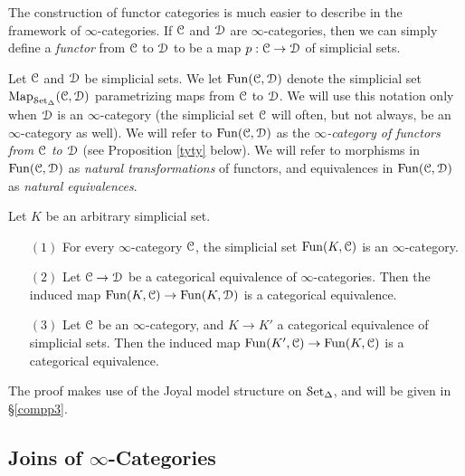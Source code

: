 \begin{Didn't Read}
The construction of functor categories is much easier to describe in the framework of $\infty$-categories. If $\calC$ and $\calD$ are
$\infty$-categories, then we can simply define a {\it functor} from
$\calC$ to $\calD$ to be a map $p: \calC \rightarrow \calD$ of simplicial sets.

\begin{notation}
Let $\calC$ and $\calD$ be simplicial sets. We let $\Fun(\calC, \calD)$ denote the
simplicial set $\bHom_{\sSet}(\calC, \calD)$ parametrizing maps from $\calC$ to $\calD$.
We will use this notation only when $\calD$ is an $\infty$-category (the simplicial set $\calC$ will often, but not always, be an $\infty$-category as well). We will refer to $\Fun(\calC, \calD)$ as the
{\it $\infty$-category of functors from $\calC$ to $\calD$} (see Proposition \ref{tyty} below).
We will refer to morphisms in $\Fun(\calC, \calD)$ as {\it natural transformations} of functors, and
equivalences in $\Fun(\calC, \calD)$ as {\it natural equivalences}.
\end{notation}

\begin{proposition}\label{tyty}
Let $K$ be an arbitrary simplicial set.
\begin{itemize}
\item[$(1)$] For every $\infty$-category $\calC$, the simplicial set $\Fun(K,\calC)$ is an $\infty$-category.

\item[$(2)$] Let $\calC \rightarrow \calD$ be a categorical equivalence of $\infty$-categories. Then the induced map $\Fun(K,\calC) \rightarrow \Fun(K,\calD)$ is a categorical equivalence.

\item[$(3)$] Let $\calC$ be an $\infty$-category, and $K \rightarrow K'$ a categorical equivalence of simplicial sets. Then the induced map $\Fun(K',\calC) \rightarrow \Fun(K,\calC)$ is a categorical equivalence.
\end{itemize}
\end{proposition}

The proof makes use of the Joyal model structure on $\sSet$, and will be given in \S \ref{compp3}.

\subsection{Joins of $\infty$-Categories}\label{join}


\end{Didn't Read}
